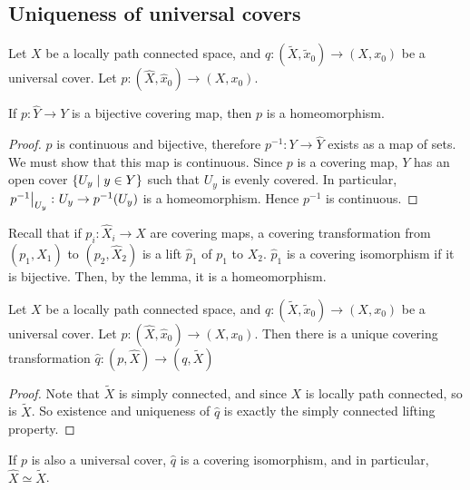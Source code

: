 \subsection{Uniqueness of universal covers}
Let \( X \) be a locally path connected space, and \( q \colon (\widetilde X, \widetilde x_0) \to (X,x_0) \) be a universal cover.
Let \( p \colon (\hat X, \hat x_0) \to (X, x_0) \).
\begin{lemma}
	If \( p \colon \hat Y \to Y \) is a bijective covering map, then \( p \) is a homeomorphism.
\end{lemma}
\begin{proof}
	\( p \) is continuous and bijective, therefore \( p^{-1} \colon Y \to \hat Y \) exists as a map of sets.
	We must show that this map is continuous.
	Since \( p \) is a covering map, \( Y \) has an open cover \( \qty{U_y \mid y \in Y} \) such that \( U_y \) is evenly covered.
	In particular, \( \eval{p^{-1}}_{U_y} \colon U_y \to p^{-1}(U_y) \) is a homeomorphism.
	Hence \( p^{-1} \) is continuous.
\end{proof}
Recall that if \( p_i \colon \hat X_i \to X \) are covering maps, a covering transformation from \( (p_1, \hat X_1) \) to \( (p_2, \hat X_2) \) is a lift \( \hat p_1 \) of \( p_1 \) to \( X_2 \).
\( \hat p_1 \) is a covering isomorphism if it is bijective.
Then, by the lemma, it is a homeomorphism.
\begin{proposition}
	Let \( X \) be a locally path connected space, and \( q \colon (\widetilde X, \widetilde x_0) \to (X,x_0) \) be a universal cover.
	Let \( p \colon (\hat X, \hat x_0) \to (X, x_0) \).
	Then there is a unique covering transformation \( \hat q \colon (p, \hat X) \to (q, \widetilde X) \)
	\begin{center}
	\end{center}
\end{proposition}
\begin{proof}
	Note that \( \widetilde X \) is simply connected, and since \( X \) is locally path connected, so is \( \widetilde X \).
	So existence and uniqueness of \( \hat q \) is exactly the simply connected lifting property.
\end{proof}
\begin{corollary}
	If \( p \) is also a universal cover, \( \hat q \) is a covering isomorphism, and in particular, \( \hat X \simeq \widetilde X \).
\end{corollary}
